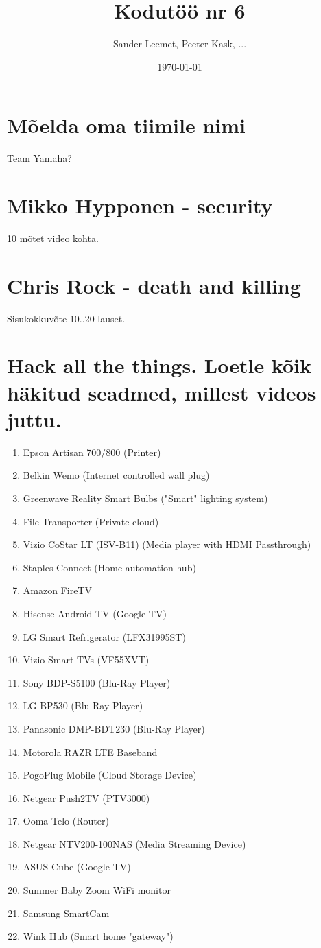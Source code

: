 \documentclass{article}
\title{Kodutöö nr 6}
\author{Sander Leemet, Peeter Kask, ...}
\date{\today}
\begin{document}
\maketitle

\section{Mõelda oma tiimile nimi}
Team Yamaha?

\section{Mikko Hypponen - security}
10 mõtet video kohta.

\section{Chris Rock - death and killing}
Sisukokkuvõte 10..20 lauset.

\section{Hack all the things. Loetle kõik häkitud seadmed, millest videos juttu.}
\begin{enumerate}
	\item{Epson Artisan 700/800 (Printer)}
	\item{Belkin Wemo (Internet controlled wall plug)}
	\item{Greenwave Reality Smart Bulbs ("Smart" lighting system)}
	\item{File Transporter (Private cloud)}
	\item{Vizio CoStar LT (ISV-B11) (Media player with HDMI Passthrough)}
	\item{Staples Connect (Home automation hub)}
	\item{Amazon FireTV}
	\item{Hisense Android TV (Google TV)}
	\item{LG Smart Refrigerator (LFX31995ST)}
	\item{Vizio Smart TVs (VF55XVT)}
	\item{Sony BDP-S5100 (Blu-Ray Player)}
	\item{LG BP530 (Blu-Ray Player)}
	\item{Panasonic DMP-BDT230 (Blu-Ray Player)}
	\item{Motorola RAZR LTE Baseband}
	\item{PogoPlug Mobile (Cloud Storage Device)}
	\item{Netgear Push2TV (PTV3000)}
	\item{Ooma Telo (Router)}
	\item{Netgear NTV200-100NAS (Media Streaming Device)}
	\item{ASUS Cube (Google TV)}
	\item{Summer Baby Zoom WiFi monitor}
	\item{Samsung SmartCam}
	\item{Wink Hub (Smart home "gateway")}
\end{enumerate}
\end{document}
